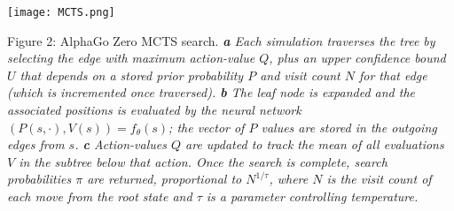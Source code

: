 \documentclass[12pt,a4paper]{report}
\begin{document}
\begin{center}
\texttt{[image: MCTS.png]}\par
\end{center}
\begin{small}
Figure 2: AlphaGo Zero MCTS search. \textit{\textbf{a} Each simulation traverses the tree by selecting the edge with maximum action-value \(Q\), plus an upper conﬁdence bound \(U\) that depends on a stored prior probability \(P\) and visit count \(N\) for that edge (which is incremented once traversed). \textbf{b} The leaf node is expanded and the associated positions is evaluated by the neural network \((P(s,·),V (s)) = f_\theta(s)\); the vector of \(P\) values are stored in the outgoing edges from \(s\). \textbf{c} Action-values \(Q\) are updated to track the mean of all evaluations \(V\) in the subtree below that action. Once the search is complete, search probabilities \(\pi\) are returned, proportional to \(N^{1/\tau}\), where \(N\) is the visit count of each move from the root state and \(\tau\) is a parameter controlling temperature.}\par
\end{small}
\clearpage
\end{document}
